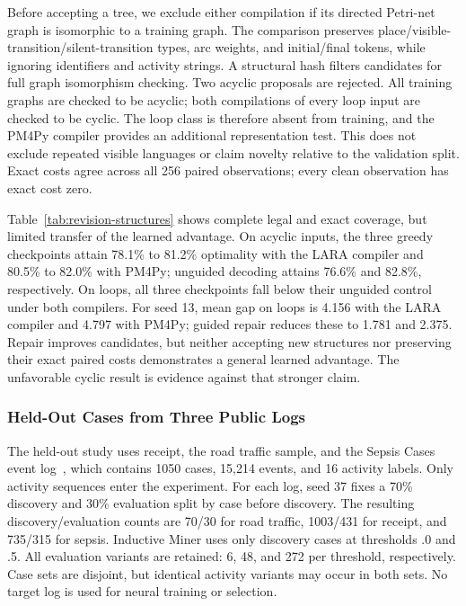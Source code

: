 \begin{revised}
Before accepting a tree, we exclude either compilation if its directed Petri-net graph is isomorphic to a training graph. The comparison preserves place/visible-transition/silent-transition types, arc weights, and initial/final tokens, while ignoring identifiers and activity strings. A structural hash filters candidates for full graph isomorphism checking. Two acyclic proposals are rejected. All training graphs are checked to be acyclic; both compilations of every loop input are checked to be cyclic. The loop class is therefore absent from training, and the PM4Py compiler provides an additional representation test. This does not exclude repeated visible languages or claim novelty relative to the validation split. Exact costs agree across all 256 paired observations; every clean observation has exact cost zero.



Table~\ref{tab:revision-structures} shows complete legal and exact coverage, but limited transfer of the learned advantage. On acyclic inputs, the three greedy checkpoints attain 78.1\% to 81.2\% optimality with the LARA compiler and 80.5\% to 82.0\% with PM4Py; unguided decoding attains 76.6\% and 82.8\%, respectively. On loops, all three checkpoints fall below their unguided control under both compilers. For seed 13, mean gap on loops is 4.156 with the LARA compiler and 4.797 with PM4Py; guided repair reduces these to 1.781 and 2.375. Repair improves candidates, but neither accepting new structures nor preserving their exact paired costs demonstrates a general learned advantage. The unfavorable cyclic result is evidence against that stronger claim.

\subsubsection{Held-Out Cases from Three Public Logs}

The held-out study uses receipt, the road traffic sample, and the Sepsis Cases event log~\cite{SepsisLog}, which contains 1050 cases, 15,214 events, and 16 activity labels. Only activity sequences enter the experiment. For each log, seed 37 fixes a 70\% discovery and 30\% evaluation split by case before discovery. The resulting discovery/evaluation counts are 70/30 for road traffic, 1003/431 for receipt, and 735/315 for sepsis. Inductive Miner uses only discovery cases at thresholds .0 and .5. All evaluation variants are retained: 6, 48, and 272 per threshold, respectively. Case sets are disjoint, but identical activity variants may occur in both sets. No target log is used for neural training or selection.


\end{revised}
